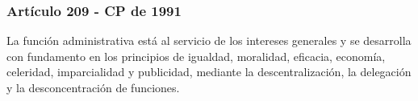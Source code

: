 \documentclass{beamer}
\begin{document}


\begin{frame}
  \frametitle{Art\'iculo 209 - CP de 1991}
  La funci\'on administrativa est\'a al servicio de los intereses generales y se desarrolla con fundamento en los principios de igualdad, moralidad, eficacia, econom\'ia, celeridad, imparcialidad y publicidad, mediante la descentralizaci\'on, la delegaci\'on y la desconcentraci\'on de funciones.
\end{frame}
\end{document}
